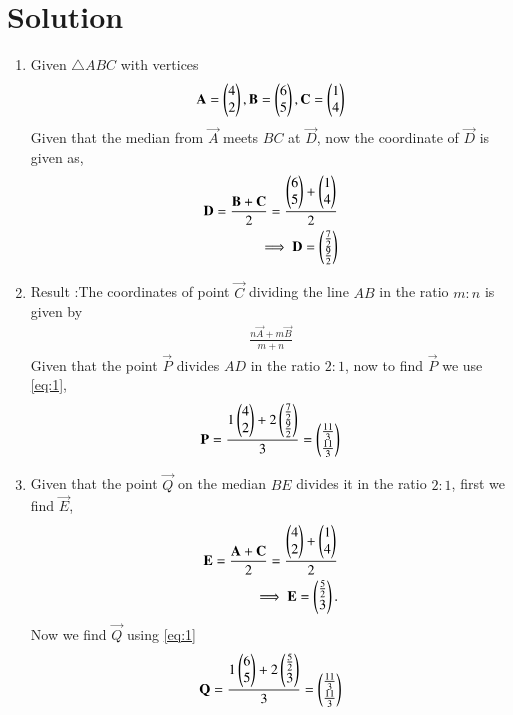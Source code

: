 \documentclass[journal,12pt,twocolumn]{IEEEtran}
\begin{document}
\section{Solution}
\begin{enumerate}[label=\alph*.]
\item  Given $\triangle ABC$ with vertices
\begin{align}
  \mathbf{A} = \begin{pmatrix}4 \\ 2\end{pmatrix}, \mathbf{B}=\begin{pmatrix}6 \\ 5\end{pmatrix},         \mathbf{C}=\begin{pmatrix}1 \\ 4\end{pmatrix}  
\end{align}
Given that the median from $\vec{A}$ meets $BC$ at $\vec{D}$, now the coordinate of $\vec{D}$ is given as,
\begin{align}
    \mathbf{D} = \frac{\mathbf{B}+\mathbf{C}}{2} = \frac{\begin{pmatrix}6 \\ 5\end{pmatrix}+\begin{pmatrix}1 \\ 4\end{pmatrix}}{2}\\
    \implies \mathbf{D} = \begin{pmatrix}\frac{7}{2} \\ \frac{9}{2}\end{pmatrix}
\end{align}
\item  Result :The coordinates of point $\vec{C}$ dividing the line $AB$ in the ratio $m:n$ is given by 
\begin{align}
  \frac{n\vec{A}+m\vec{B}}{m+n}  \label{eq:1}
\end{align}
Given that the point $\vec{P}$ divides $AD$ in the ratio $2:1$, now to find $\vec{P}$ we use \eqref{eq:1},
\begin{align}
    \mathbf{P}=\frac{1\begin{pmatrix}4\\2\end{pmatrix}+2\begin{pmatrix}\frac{7}{2}\\ \frac{9}{2}\end{pmatrix}}{3}=\begin{pmatrix}\frac{11}{3} \\ \frac{11}{3}\end{pmatrix}
\end{align}
\item Given that the point $\vec{Q}$ on the median $BE$ divides it in the ratio $2:1$, first we find $\vec{E}$,
\begin{align}
    \mathbf{E} =\frac{\mathbf{A}+\mathbf{C}}{2} = \frac{\begin{pmatrix}4 \\ 2\end{pmatrix}+\begin{pmatrix}1 \\ 4\end{pmatrix}}{2}\\
    \implies \mathbf{E} = \begin{pmatrix}\frac{5}{2} \\ 3\end{pmatrix}.
\end{align}
Now we find $\vec{Q}$ using \eqref{eq:1}
\begin{align}
   \vec{Q}=\frac{1\myvec{6\\5}+2\myvec{\frac{5}{2}\\3}}{3}=\myvec{\frac{11}{3} \\ \frac{11}{3}} 

\end{align}
\end{enumerate}
\end{document}
